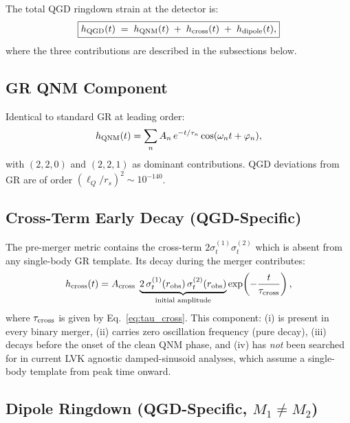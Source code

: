 \documentclass[11pt,a4paper]{article}
\theoremstyle{definition}
\theoremstyle{remark}
\newcommand{\sig}[2]{\sigma_{#1}^{(#2)}}
\newcommand{\lQ}{\ell_{Q}}
\begin{document}
	The total QGD ringdown strain at the detector is:
	\begin{equation}
		\boxed{
			h_{\rm QGD}(t)
			\;=\;
			h_{\rm QNM}(t)
			\;+\;
			h_{\rm cross}(t)
			\;+\;
			h_{\rm dipole}(t),
		}
		\label{eq:h_qgd}
	\end{equation}
	where the three contributions are described in the subsections below.
	
	\subsection{GR QNM Component}
	
	Identical to standard GR at leading order:
	\begin{equation}
		h_{\rm QNM}(t)
		= \sum_n A_n\,e^{-t/\tau_n}\cos(\omega_n t + \varphi_n),
		\label{eq:h_qnm}
	\end{equation}
	with $(2,2,0)$ and $(2,2,1)$ as dominant contributions.
	QGD deviations from GR are of order $(\lQ/r_s)^2\sim10^{-140}$.
	
	\subsection{Cross-Term Early Decay (QGD-Specific)}
	
	The pre-merger metric contains the cross-term $2\sig{t}{1}\sig{t}{2}$
	which is absent from any single-body GR template.  Its decay during the
	merger contributes:
	\begin{equation}
		h_{\rm cross}(t)
		= A_{\rm cross}\;\underbrace{2\,\sig{t}{1}(r_{\rm obs})\,\sig{t}{2}(r_{\rm obs})}_{\text{initial amplitude}}
		\exp\!\left(-\frac{t}{\tau_{\rm cross}}\right),
		\label{eq:h_cross}
	\end{equation}
	where $\tau_{\rm cross}$ is given by Eq.~\eqref{eq:tau_cross}.
	This component: (i) is present in every binary merger, (ii) carries
	zero oscillation frequency (pure decay), (iii) decays before the
	onset of the clean QNM phase, and (iv) has \emph{not} been searched for
	in current LVK agnostic damped-sinusoid analyses, which assume a
	single-body template from peak time onward.
	
	\subsection{Dipole Ringdown (QGD-Specific, $M_1\neq M_2$)}
	
\end{document}
